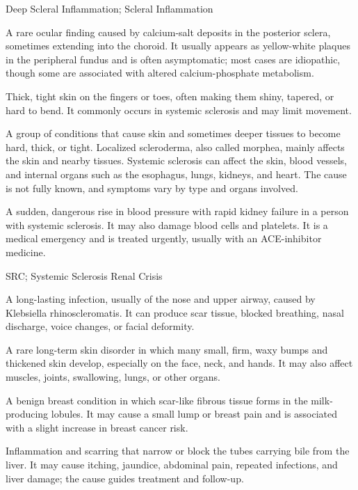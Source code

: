 \synonyms
Deep Scleral Inflammation; Scleral Inflammation

 A rare ocular finding caused by calcium-salt deposits in the posterior sclera, sometimes extending into the choroid. It usually appears as yellow-white plaques in the peripheral fundus and is often asymptomatic; most cases are idiopathic, though some are associated with altered calcium-phosphate metabolism.

 Thick, tight skin on the fingers or toes, often making them shiny, tapered, or hard to bend. It commonly occurs in systemic sclerosis and may limit movement.

 A group of conditions that cause skin and sometimes deeper tissues to become hard, thick, or tight. Localized scleroderma, also called morphea, mainly affects the skin and nearby tissues. Systemic sclerosis can affect the skin, blood vessels, and internal organs such as the esophagus, lungs, kidneys, and heart. The cause is not fully known, and symptoms vary by type and organs involved.

 A sudden, dangerous rise in blood pressure with rapid kidney failure in a person with systemic sclerosis. It may also damage blood cells and platelets. It is a medical emergency and is treated urgently, usually with an ACE-inhibitor medicine.

\synonyms
SRC; Systemic Sclerosis Renal Crisis

 A long-lasting infection, usually of the nose and upper airway, caused by Klebsiella rhinoscleromatis. It can produce scar tissue, blocked breathing, nasal discharge, voice changes, or facial deformity.

 A rare long-term skin disorder in which many small, firm, waxy bumps and thickened skin develop, especially on the face, neck, and hands. It may also affect muscles, joints, swallowing, lungs, or other organs.

 A benign breast condition in which scar-like fibrous tissue forms in the milk-producing lobules. It may cause a small lump or breast pain and is associated with a slight increase in breast cancer risk.

 Inflammation and scarring that narrow or block the tubes carrying bile from the liver. It may cause itching, jaundice, abdominal pain, repeated infections, and liver damage; the cause guides treatment and follow-up.


